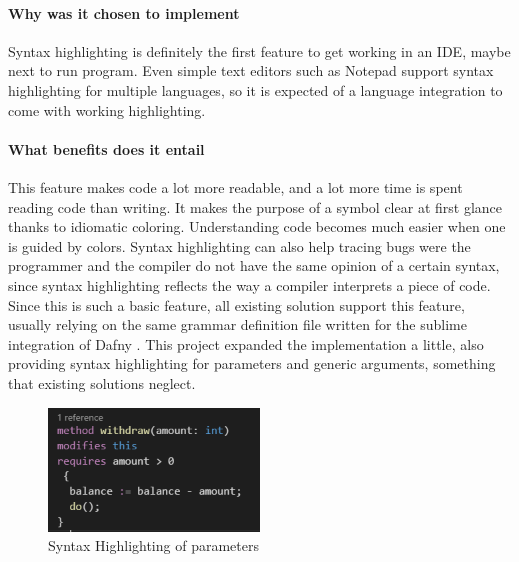 \paragraph{Why was it chosen to implement}
Syntax highlighting is definitely the first feature to get working in an IDE, maybe next to run program. Even simple text editors such as Notepad support syntax highlighting for multiple languages, so it is expected of a language integration to come with working highlighting.
\paragraph{What benefits does it entail}
This feature makes code a lot more readable, and a lot more time is spent reading code than writing. It makes the purpose of a symbol clear at first glance thanks to idiomatic coloring. Understanding code becomes much easier when one is guided by colors. Syntax highlighting can also help tracing bugs were the programmer and the compiler do not have the same opinion of a certain syntax, since syntax highlighting reflects the way a compiler interprets a piece of code. \newline
Since this is such a basic feature, all existing solution support this feature, usually relying on the same grammar definition file written for the sublime integration of Dafny \cite{sublime}. This project expanded the implementation a little, also providing syntax highlighting for parameters and generic arguments, something that existing solutions neglect.
\begin{figure}[H]
	\centering
	\includegraphics[width=0.5\textwidth]{img/syntaxHighlightingMethod}
	\caption{Syntax Highlighting of parameters}
	\label{fig:agsyntaxHighlightingMethod}
\end{figure}